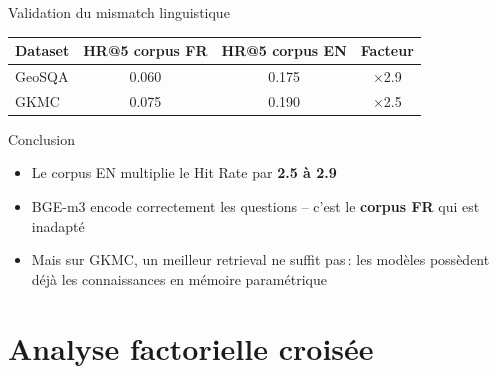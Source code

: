 \documentclass[aspectratio=169, 12pt]{beamer}
\begin{document}
\begin{frame}{Validation du mismatch linguistique}
  \begin{table}
    \centering
    \begin{tabular}{@{} l c c c @{}}
      \toprule
      \textbf{Dataset} & \textbf{HR@5 corpus FR} & \textbf{HR@5 corpus EN} & \textbf{Facteur} \\
      \midrule
      GeoSQA & 0.060 & 0.175 & $\times$2.9 \\
      GKMC & 0.075 & 0.190 & $\times$2.5 \\
      \bottomrule
    \end{tabular}
  \end{table}

  \vspace{0.4cm}

  \begin{block}{Conclusion}
    \begin{itemize}
      \item Le corpus EN multiplie le Hit Rate par \textbf{2.5 \`a 2.9}
      \item BGE-m3 encode correctement les questions -- c'est le \textbf{corpus FR} qui est inadapt\'e
      \item Mais sur GKMC, un meilleur retrieval ne suffit pas\,: les mod\`eles poss\`edent d\'ej\`a les connaissances en m\'emoire param\'etrique
    \end{itemize}
  \end{block}
\end{frame}

\section{Analyse factorielle crois\'ee}
\end{document}
